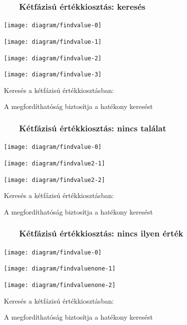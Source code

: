 \documentclass[
]{beamer}
\newcommand{\slidetitle}[2]{\frametitle{{\small #1 ~ \ding{226} ~ } \normalsize \textbf{#2} }}
\begin{document}
\begin{frame}
    \slidetitle{\sectionshorttitle}{Kétfázisú értékkiosztás: keresés}
    
    \centering
    
    \begin{overprint}
        \centerline{\texttt{[image: diagram/findvalue-0]}}
        \centerline{\texttt{[image: diagram/findvalue-1]}}
        \centerline{\texttt{[image: diagram/findvalue-2]}}
        \centerline{\texttt{[image: diagram/findvalue-3]}}
    \end{overprint}
    
    \vspace{0.5cm}
    
    Keresés a kétfázisú értékkiosztásban: \par
    A megfordíthatóság biztosítja a hatékony keresést
\end{frame}

\begin{frame}
    \slidetitle{\sectionshorttitle}{Kétfázisú értékkiosztás: nincs találat}
    
    \centering
    
    \begin{overprint}
        \centerline{\texttt{[image: diagram/findvalue-0]}}
        \centerline{\texttt{[image: diagram/findvalue2-1]}}
        \centerline{\texttt{[image: diagram/findvalue2-2]}}
    \end{overprint}
    
    \vspace{0.5cm}
    
    Keresés a kétfázisú értékkiosztásban: \par
    A megfordíthatóság biztosítja a hatékony keresést
\end{frame}

\begin{frame}
    \slidetitle{\sectionshorttitle}{Kétfázisú értékkiosztás: nincs ilyen érték}
    
    \centering
    
    \begin{overprint}
        \centerline{\texttt{[image: diagram/findvalue-0]}}
        \centerline{\texttt{[image: diagram/findvaluenone-1]}}
        \centerline{\texttt{[image: diagram/findvaluenone-2]}}
    \end{overprint}
    
    \vspace{0.5cm}
    
    Keresés a kétfázisú értékkiosztásban: \par
    A megfordíthatóság biztosítja a hatékony keresést
\end{frame}
\end{document}
